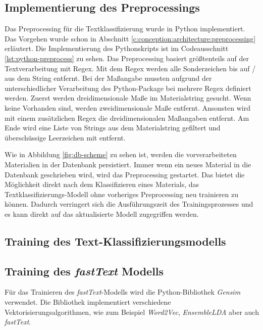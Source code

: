 \subsection{Implementierung des Preprocessings}
\label{c:implementation:preprocess}
Das Preprocessing für die Textklassifizierung wurde in Python implementiert.
Das Vorgehen wurde schon in Abschnitt \ref{c:conception:architecture:preprocessing} erläutert. Die Implementierung des Pythonskripts ist im Codeausschnitt \ref{lst:python-preprocess} zu sehen. Das Preprocessing basiert größtenteils auf der Textverarbeitung mit Regex. Mit dem Regex \code{[A-Za-z0-9üäöÜÄÖßóåéèÉÈÓ/]} werden alle Sonderzeichen bis auf  \glqq /\grqq{} aus dem String entfernt. Bei der Maßangabe mussten aufgrund der unterschiedlicher Verarbeitung des Python-Package  bei   mehrere Regex definiert werden. Zuerst werden dreidimensionale Maße im Materialstring gesucht. Wenn keine Vorhanden sind, werden zweidimensionale Maße entfernt. Ansonsten wird mit einem zusätzlichen Regex die dreidimensionalen Maßangaben entfernt. Am Ende wird eine Liste von Strings aus dem Materialstring gefiltert und überschüssige Leerzeichen mit  entfernt. 

Wie in Abbildung \ref{fig:db-scheme} zu sehen ist, werden die vorverarbeiteten Materialien in der Datenbank persistiert. Immer wenn ein neues Material in die Datenbank geschrieben wird, wird das Preprocessing gestartet. Das bietet die Möglichkeit direkt nach dem Klassifizieren eines Materials, das Textklassifizierungs-Modell ohne vorheriges Preprocessing neu trainieren zu können. Dadurch verringert sich die Ausführungszeit des Trainingsprozesses und es kann direkt auf das aktualisierte Modell zugegriffen werden.
\subsection{Training des Text-Klassifizierungsmodells}
\label{c:implementation:classification-training}
\subsection{Training des \textit{fastText} Modells}
\label{c:implementation:embedding-training}
Für das Trainieren des \textit{fastText}-Modells wird die Python-Bibliothek \textit{Gensim}  \citep{rehurek_lrec} verwendet. Die Bibliothek implementiert verschiedene Vektorisierungsalgorithmen, wie zum Beispiel \textit{Word2Vec}, \textit{EnsembleLDA} aber auch \textit{fastText}.

